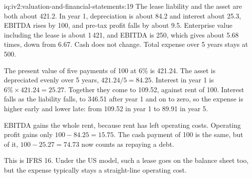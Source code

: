 \begin{solution}{iq:iv2:valuation-and-financial-statements:19}
The lease liability and the asset are both about 421.2. In year 1, depreciation is about 84.2 and interest about 25.3, EBITDA rises by 100, and pre-tax profit falls by about 9.5. Enterprise value including the lease is about 1\,421, and EBITDA is 250, which gives about 5.68 times, down from 6.67. Cash does not change. Total expense over 5 years stays at 500.

The present value of five payments of 100 at 6\% is 421.24. The asset is depreciated evenly over 5 years, $421.24/5 = 84.25$. Interest in year 1 is $6\% \times 421.24 = 25.27$. Together they come to 109.52, against rent of 100. Interest falls as the liability falls, to 346.51 after year 1 and on to zero, so the expense is higher early and lower late: from 109.52 in year 1 to 89.91 in year 5.

EBITDA gains the whole rent, because rent has left operating costs. Operating profit gains only $100 - 84.25 = 15.75$. The cash payment of 100 is the same, but of it, $100 - 25.27 = 74.73$ now counts as repaying a debt.

This is IFRS 16. Under the US model, such a lease goes on the balance sheet too, but the expense typically stays a straight-line operating cost.

\end{solution}

